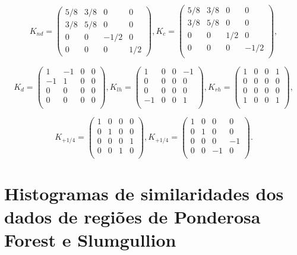 \documentclass[12pt]{article}
\begin{document}
\[K_{nd} =
\begin{pmatrix}
5/8 & 3/8 & 0 & 0\\
3/8 & 5/8 & 0 & 0\\
0 & 0 & -1/2 & 0\\
0 & 0 & 0 & 1/2
\end{pmatrix},
K_{c} =
\begin{pmatrix}
5/8 & 3/8 & 0 & 0\\
3/8 & 5/8 & 0 & 0\\
0 & 0 & 1/2 & 0\\
0 & 0 & 0 & -1/2\\
\end{pmatrix}
,\]

\[K_d=
\begin{pmatrix}
1 & -1 & 0 & 0\\
-1 & 1 & 0 & 0\\
0 & 0 & 0 & 0\\
0 & 0 & 0 & 0\\
\end{pmatrix},
K_{lh}=
\begin{pmatrix}
1 & 0 & 0 & -1\\
0 & 0 & 0 & 0\\
0 & 0 & 0 & 0\\
-1 & 0 & 0 & 1\\
\end{pmatrix},
K_{rh}=
\begin{pmatrix}
1 & 0 & 0 & 1\\
0 & 0 & 0 & 0\\
0 & 0 & 0 & 0\\
1 & 0 & 0 & 1\\
\end{pmatrix}
,\]

\[K_{+1/4}=
\begin{pmatrix}
1 & 0 & 0 & 0\\
0 & 1 & 0 & 0\\
0 & 0 & 0 & 1\\
0 & 0 & 1 & 0\\
\end{pmatrix},
K_{+1/4}=
\begin{pmatrix}
1 & 0 & 0 & 0\\
0 & 1 & 0 & 0\\
0 & 0 & 0 & -1\\
0 & 0 & -1 & 0\\
\end{pmatrix}
.\]

\section{Histogramas de similaridades dos dados de regiões de Ponderosa Forest e Slumgullion}
\end{document}
